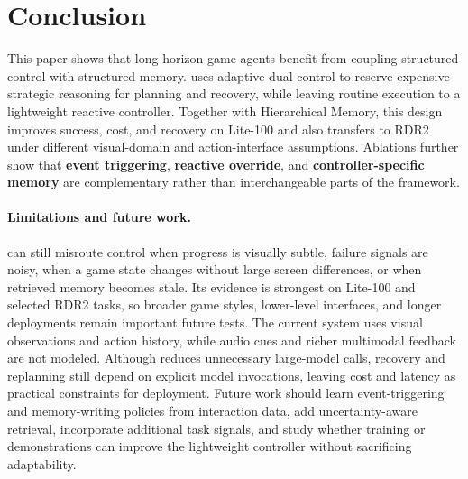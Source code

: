 \section{Conclusion}
\label{sec:conclusion}

This paper shows that long-horizon game agents benefit from coupling structured
control with structured memory. \textbf{\method{}} uses adaptive dual control to reserve
expensive strategic reasoning for planning and recovery, while leaving routine
execution to a lightweight reactive controller. Together with Hierarchical
Memory, this design improves success, cost, and recovery on Lite-100 and also
transfers to RDR2 under different visual-domain and action-interface assumptions.
Ablations further show that \textbf{event triggering}, \textbf{reactive
override}, and \textbf{controller-specific memory} are complementary rather than
interchangeable parts of the framework.

\paragraph{Limitations and future work.}
\label{sec:limitations}
\method{} can still misroute control when progress is visually subtle, failure
signals are noisy, when a game state changes without large screen differences,
or when retrieved memory becomes stale. Its evidence is strongest on Lite-100
and selected RDR2 tasks, so broader game styles, lower-level interfaces, and
longer deployments remain important future tests. The current system uses visual
observations and action history, while audio cues and richer multimodal feedback
are not modeled. Although \method{} reduces unnecessary large-model calls,
recovery and replanning still depend on explicit model invocations, leaving cost
and latency as practical constraints for deployment. Future work should learn
event-triggering and memory-writing policies from interaction data, add
uncertainty-aware retrieval, incorporate additional task signals, and study
whether training or demonstrations can improve the lightweight controller
without sacrificing adaptability.
